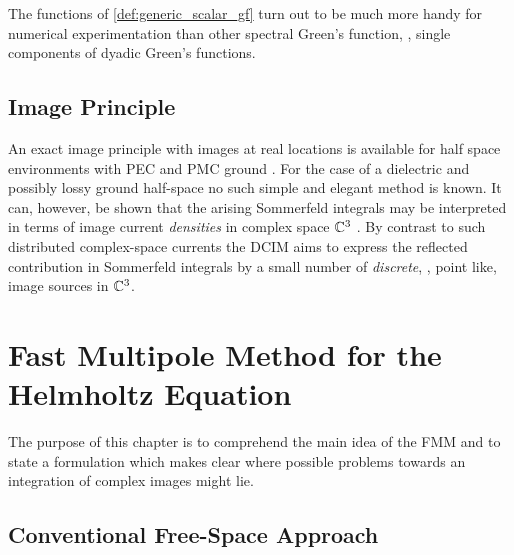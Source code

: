 The functions of \cref{def:generic_scalar_gf} turn out to be much more 
handy for numerical experimentation than other spectral Green's function,
\eg, single components of dyadic Green's functions.







\section{Image Principle}
\label{sec:imgage_principle}

An exact image principle with images at real locations is available
for half space environments with \ac{PEC} and \ac{PMC} ground
\cite[243]{Sommerfeld1964}\cite[pp.~94]{Jin2015}.
For the case of a dielectric and possibly lossy ground half-space no such 
simple and elegant method is known.
It can, however, be shown that the arising Sommerfeld integrals may be 
interpreted in terms of image current \emph{densities} in complex space $\mathbb{C}^3$
\cite[250]{Sommerfeld1964}\cite[Chapter~7]{Lindell2000}.
By contrast to such distributed complex-space currents the \ac{DCIM} aims to 
express the reflected contribution in Sommerfeld integrals by a small number
of \emph{discrete}, \ie, point like, image sources in $\mathbb{C}^3$.







\chapter{Fast Multipole Method for the Helmholtz Equation}
\label{ch:fmm}

The purpose of this chapter is to comprehend the main idea of the \ac{FMM}
and to state a formulation which makes clear where possible problems towards an
integration of complex images might lie.






\section{Conventional Free-Space Approach}

